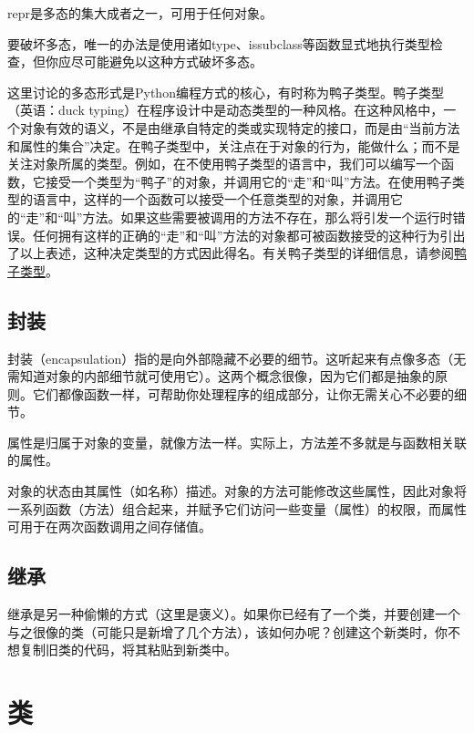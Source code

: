 repr是多态的集大成者之一，可用于任何对象。

要破坏多态，唯一的办法是使用诸如type、issubclass等函数显式地执行类型检查，但你应尽可能避免以这种方式破坏多态。

\begin{tcolorbox}
    这里讨论的多态形式是Python编程方式的核心，有时称为鸭子类型。鸭子类型（英语：duck typing）在程序设计中是动态类型的一种风格。在这种风格中，一个对象有效的语义，不是由继承自特定的类或实现特定的接口，而是由“当前方法和属性的集合”决定。在鸭子类型中，关注点在于对象的行为，能做什么；而不是关注对象所属的类型。例如，在不使用鸭子类型的语言中，我们可以编写一个函数，它接受一个类型为“鸭子”的对象，并调用它的“走”和“叫”方法。在使用鸭子类型的语言中，这样的一个函数可以接受一个任意类型的对象，并调用它的“走”和“叫”方法。如果这些需要被调用的方法不存在，那么将引发一个运行时错误。任何拥有这样的正确的“走”和“叫”方法的对象都可被函数接受的这种行为引出了以上表述，这种决定类型的方式因此得名。有关鸭子类型的详细信息，请参阅\href{http://en.wikipedia.org/wiki/Duck_typing}{鸭子类型}。
\end{tcolorbox}

\subsection{封装}
封装（encapsulation）指的是向外部隐藏不必要的细节。这听起来有点像多态（无需知道对象的内部细节就可使用它）。这两个概念很像，因为它们都是抽象的原则。它们都像函数一样，可帮助你处理程序的组成部分，让你无需关心不必要的细节。


属性是归属于对象的变量，就像方法一样。实际上，方法差不多就是与函数相关联的属性。

对象的状态由其属性（如名称）描述。对象的方法可能修改这些属性，因此对象将一系列函数（方法）组合起来，并赋予它们访问一些变量（属性）的权限，而属性可用于在两次函数调用之间存储值。

\subsection{继承}
继承是另一种偷懒的方式（这里是褒义）。如果你已经有了一个类，并要创建一个与之很像的类（可能只是新增了几个方法），该如何办呢？创建这个新类时，你不想复制旧类的代码，将其粘贴到新类中。

\section{类}
